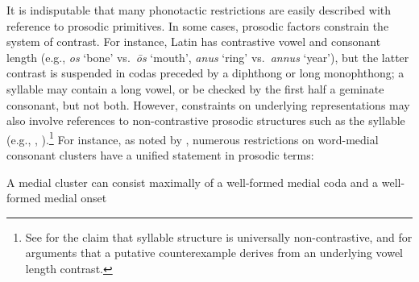 \label{gaps} 

It is indisputable that many phonotactic restrictions are easily described with reference to prosodic primitives.
In some cases, prosodic factors constrain the system of contrast.
For instance, Latin has contrastive vowel and consonant length (e.g., \emph{os} `bone' vs.~\emph{ōs} `mouth', \emph{anus} `ring' vs.~\emph{annus} `year'), but the latter contrast is suspended in codas preceded by a diphthong or long monophthong; a syllable may contain a long vowel, or be checked by the first half a geminate consonant, but not both.
However, constraints on underlying representations may also involve references to non-contrastive prosodic structures such as the syllable (e.g., \citealt{Hooper1973}, \citealt{Kahn1976}).\footnote{
    See \citealt{Blevins1995} for the claim that syllable structure is universally non-contrastive, and \citealt{Elfner2006} for arguments that a putative counterexample derives from an underlying vowel length contrast.}
For instance, as noted by \citet{Haugen1956}, 
numerous restrictions on word-medial consonant clusters have a unified statement in prosodic terms:

\begin{example}
\label{mcl}
A medial cluster can consist maximally of a well-formed medial coda and a well-formed medial onset
\end{example}

